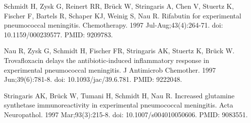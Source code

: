 \documentclass[
]{article}
\begin{document}
Schmidt H, Zysk G, Reinert RR, Brück W, Stringaris A, Chen V, Stuertz K,
Fischer F, Bartels R, Schaper KJ, Weinig S, Nau R. Rifabutin for
experimental pneumococcal meningitis. Chemotherapy. 1997
Jul-Aug;43(4):264-71. doi: 10.1159/000239577. PMID: 9209783.

Nau R, Zysk G, Schmidt H, Fischer FR, Stringaris AK, Stuertz K, Brück W.
Trovafloxacin delays the antibiotic-induced inflammatory response in
experimental pneumococcal meningitis. J Antimicrob Chemother. 1997
Jun;39(6):781-8. doi: 10.1093/jac/39.6.781. PMID: 9222048.

Stringaris AK, Brück W, Tumani H, Schmidt H, Nau R. Increased glutamine
synthetase immunoreactivity in experimental pneumococcal meningitis.
Acta Neuropathol. 1997 Mar;93(3):215-8. doi: 10.1007/s004010050606.
PMID: 9083551.
\end{document}
